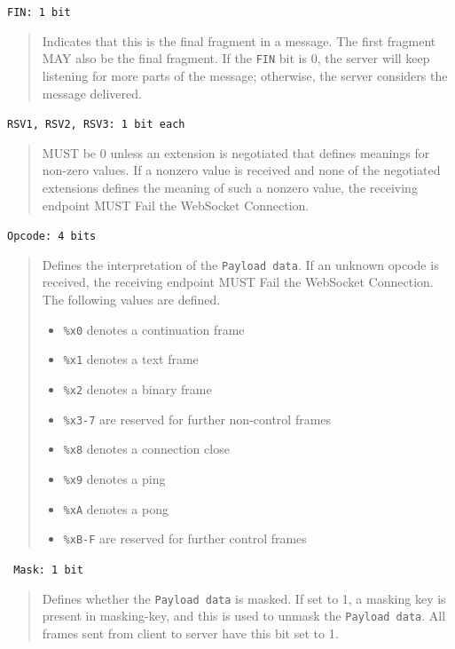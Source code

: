 \documentclass[a4paper, justified, notoc]{tufte-handout} %
\begin{document}
\noindent \texttt{FIN:  1 bit} 
\begin{quote}
    Indicates that this is the final fragment in a message.  The first
    fragment MAY also be the final fragment. If the \texttt{FIN} bit is 0, the server will keep listening for more parts of the message; otherwise, the server considers the message delivered.
\end{quote}

\noindent \texttt{RSV1, RSV2, RSV3:  1 bit each}
\begin{quote}
      MUST be 0 unless an extension is negotiated that defines meanings
      for non-zero values.  If a nonzero value is received and none of
      the negotiated extensions defines the meaning of such a nonzero
      value, the receiving endpoint MUST Fail the WebSocket
      Connection.
\end{quote}


\noindent   \texttt{Opcode:  4 bits}
\begin{quote}
      Defines the interpretation of the \texttt{Payload data}.  If an unknown
      opcode is received, the receiving endpoint MUST Fail the
      WebSocket Connection.  The following values are defined.
	  \begin{itemize}
      \item  \texttt{\%x0} denotes a continuation frame

      \item  \texttt{\%x1} denotes a text frame

      \item  \texttt{\%x2} denotes a binary frame

      \item  \texttt{\%x3-7} are reserved for further non-control frames

      \item  \texttt{\%x8} denotes a connection close

      \item  \texttt{\%x9} denotes a ping

      \item  \texttt{\%xA} denotes a pong

      \item  \texttt{\%xB-F} are reserved for further control frames
	  	 
	  \end{itemize}
\end{quote}
      
\noindent  \texttt{ Mask:  1 bit}
\begin{quote}
      Defines whether the \texttt{Payload data} is masked.  If set to 1, a
      masking key is present in masking-key, and this is used to unmask
      the \texttt{Payload data}.  All frames sent from
      client to server have this bit set to 1.
\end{quote}
\end{document}
